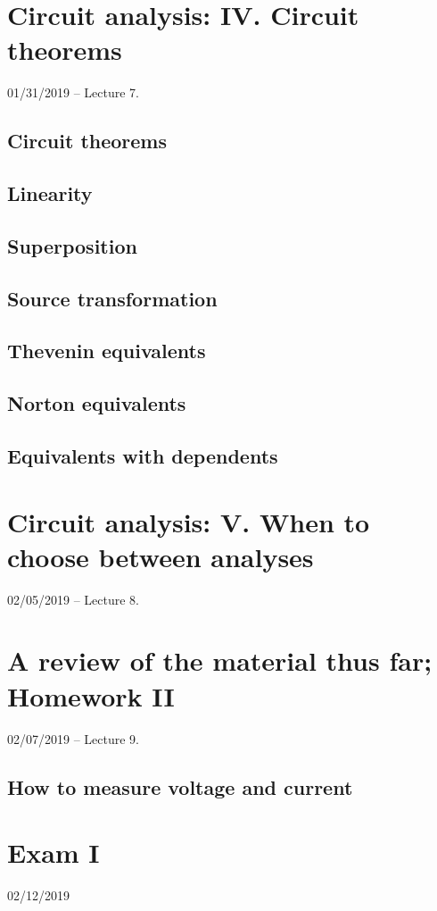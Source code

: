 \documentclass[11pt]{book}
\begin{document}
\chapter{Circuit analysis: IV. Circuit theorems}
01/31/2019 – Lecture 7. 
\section{Circuit theorems}
\section{Linearity}
\section{Superposition}
\section{Source transformation}
\section{Thevenin equivalents}
\section{Norton equivalents}
\section{Equivalents with dependents}



\chapter{Circuit analysis: V. When to choose between analyses}
02/05/2019 – Lecture 8. 

\chapter{A review of the material thus far; Homework II}
02/07/2019 – Lecture 9. 

\section{How to measure voltage and current}

\chapter*{Exam I}
02/12/2019
\end{document}
